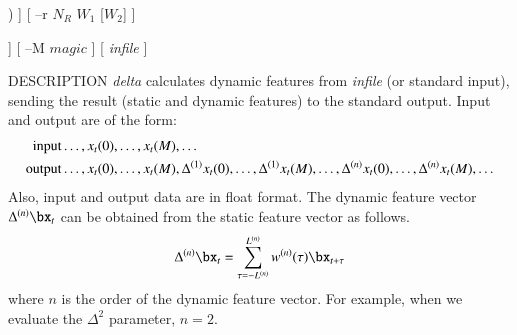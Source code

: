 \begin{synopsis}
	\item [delta] [ --m $M$ ] [ --l $L$ ] [ --t $T$ ] 
		[ --d ($fn$ $|$ $d_0$ [$d_1$ $\dots$]) ]
		[ --r $N_R$ $W_1$ [$W_2$] ]
 \item [\ ~~~~~~~]
 [ --R $N_R$ ${W_F}_{1}$ ${W_B}_{1}$ [${W_F}_{2}$ ${W_B}_{2}$]]
 [ --M $magic$ ] [ {\em infile} ]
\end{synopsis}

\begin{qsection}{DESCRIPTION}
	{\em delta} calculates dynamic features from {\em infile} (or standard
	input), sending the result (static and dynamic features) to
        the standard output. Input and output are of the form:
    \begin{align}
	\mathrm{input}  & \dots, x_t(0), \dots, x_t(M), \dots \notag \\
	\mathrm{output} & \dots, x_t(0), \dots, x_t(M), \Delta^{(1)} x_t(0), \dots, \Delta^{(1)} x_t(M), \dots,
	\Delta^{(n)} x_t(0), \dots, \Delta^{(n)} x_t(M), \dots \notag
 \end{align}
Also, input and output data are in float format.
The dynamic feature vector $\Delta^{(n)}\bx_t$ can be
obtained from the static feature vector as follows.
 \begin{displaymath}
	\Delta^{(n)}\bx_t 
	= \sum_{\tau=-L^{(n)}}^{L^{(n)}} w^{(n)}(\tau)\bx_{t+\tau}
 \end{displaymath}
where $n$ is the order of the dynamic feature vector. For
example, when we evaluate the $\Delta^2$ parameter, $n=2$.
\end{qsection}

